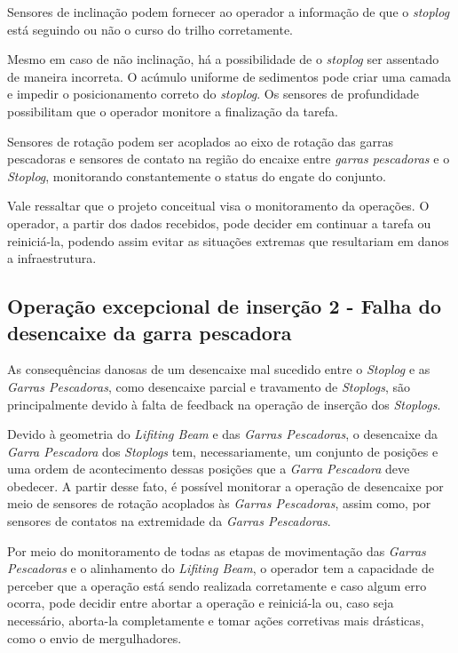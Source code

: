 Sensores de inclinação podem fornecer ao operador a informação de que o
\emph{stoplog} está seguindo ou não o curso do trilho corretamente.

Mesmo em caso de não inclinação, há a possibilidade de o \emph{stoplog} ser
assentado de maneira incorreta. O acúmulo uniforme de sedimentos pode criar uma
camada e impedir o posicionamento correto do \emph{stoplog}. Os sensores de
profundidade possibilitam que o operador monitore a finalização da tarefa.

Sensores de rotação podem ser acoplados ao eixo de rotação das garras
pescadoras e sensores de contato na região do encaixe entre \emph{garras pescadoras} e o \emph{Stoplog}, monitorando constantemente  o status do engate do conjunto.

Vale ressaltar que o projeto conceitual visa o monitoramento da operações. O
operador, a partir dos dados recebidos, pode decider em continuar a tarefa ou
reiniciá-la, podendo assim evitar as situações extremas que resultariam em danos a infraestrutura. 


\subsection{Operação excepcional de inserção 2 - Falha do desencaixe da garra pescadora}
\label{op:sol:ins:1}

As consequências danosas de um desencaixe mal sucedido entre o \emph{Stoplog} e
as \emph{Garras Pescadoras}, como desencaixe parcial e travamento de
\emph{Stoplogs}, são
principalmente devido à falta de feedback na operação de inserção dos
\emph{Stoplogs}.

Devido à geometria do \emph{Lifiting Beam} e das \emph{Garras Pescadoras}, o
desencaixe da \emph{Garra Pescadora} dos \emph{Stoplogs} tem, necessariamente,
um conjunto de posições e uma ordem de acontecimento dessas posições que a
\emph{Garra Pescadora} deve obedecer. A partir desse fato, é possível monitorar
a operação de desencaixe por meio de sensores de rotação acoplados às
\emph{Garras Pescadoras}, assim como, por sensores de contatos na extremidade da \emph{Garras Pescadoras}. 

Por meio do monitoramento de todas as etapas de movimentação das \emph{Garras
Pescadoras} e o alinhamento do \emph{Lifiting Beam}, o operador tem a capacidade
de perceber que a operação está sendo realizada corretamente e caso algum erro
ocorra, pode decidir entre abortar a operação e reiniciá-la ou, caso seja
necessário, aborta-la completamente e tomar ações corretivas mais drásticas,
como o envio de mergulhadores.

